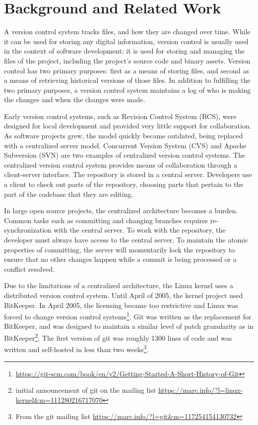 \chapter{Background and Related Work}\label{chap:background}

A version control system tracks files, and how they are changed over
time.
While it can be used for storing any digital information,
version control is usually used in the context of software development;
it is used for storing and managing the files of the project, including
the project's source code and binary assets.
Version control has two primary purposes: first as a means of storing
files, and second as a means of retrieving historical versions of those
files.
In addition to fulfilling the two primary purposes, a version control
system maintains a log of who is making the changes and when the
changes were made.

Early version control systems, such as Revision Control System (RCS),
were designed for local development and provided very little support for
collaboration.
As software projects grew, the model quickly became outdated,
being replaced with a centralized server model.
Concurrent Version System (CVS) and Apache Subversion (SVN) are two
examples of centralized version control systems. The centralized version
control system provides means of collaboration through a client-server
interface. The repository is stored in a central server. Developers use
a client to check out parts of the repository, choosing parts that
pertain to the part of the codebase that they are editing.

In large open source projects, the centralized architecture becomes a
burden. Common tasks such as committing and changing branches requires
re-synchronization with the central server.
To work with the repository,
the developer must always have access to the central server.
To maintain the atomic properties of committing, the server will
momentarily lock the repository to ensure that no other changes happen
while a commit is being processed or a conflict resolved.

Due to the limitations of a centralized architecture, the Linux kernel
uses a distributed version control system. Until April of 2005, the
kernel project used BitKeeper.
In April 2005, the licensing became too restrictive and Linux was forced
to change version control
systems\footnote{\url{https://git-scm.com/book/en/v2/Getting-Started-A-Short-History-of-Git}}.
Git was written as the replacement for BitKeeper, and was designed to
maintain a similar level of patch granularity as in BitKeeper\footnote{
  initial announcement of git on the mailing list
  \url{https://marc.info/?l=linux-kernel&m=111280216717070}}. The first
version of git was roughly 1300 lines of code and was written and
self-hosted in less than two weeks\footnote{From the git mailing list
  \url{https://marc.info/?l=git&m=117254154130732}}.

